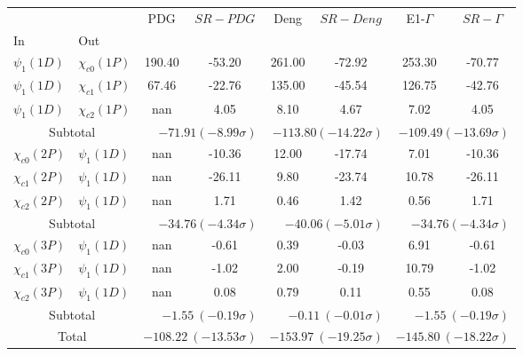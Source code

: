 \begin{tabular}{|l|l|c|c|c|c|c|c|}%
\hline%
&&PDG&$SR-PDG$&Deng&$SR-Deng$&E1-$\Gamma$&$SR-\Gamma$\\%
In&Out&&&&&&\\%
\hline%
$\psi_{1}(1D)$&$\chi_{c0}(1P)$&190.40&-53.20&261.00&-72.92&253.30&-70.77\\%
$\psi_{1}(1D)$&$\chi_{c1}(1P)$&67.46&-22.76&135.00&-45.54&126.75&-42.76\\%
$\psi_{1}(1D)$&$\chi_{c2}(1P)$&nan&4.05&8.10&4.67&7.02&4.05\\%
\hline%
\hline%
\multicolumn{2}{|c|}{Subtotal}&\multicolumn{2}{|r|}{$-71.91 (-8.99\sigma)$}&\multicolumn{2}{|r|}{$-113.80 (-14.22\sigma)$}&\multicolumn{2}{|r|}{$-109.49 (-13.69\sigma)$}\\%
\hline%
\hline%
$\chi_{c0}(2P)$&$\psi_{1}(1D)$&nan&-10.36&12.00&-17.74&7.01&-10.36\\%
$\chi_{c1}(2P)$&$\psi_{1}(1D)$&nan&-26.11&9.80&-23.74&10.78&-26.11\\%
$\chi_{c2}(2P)$&$\psi_{1}(1D)$&nan&1.71&0.46&1.42&0.56&1.71\\%
\hline%
\hline%
\multicolumn{2}{|c|}{Subtotal}&\multicolumn{2}{|r|}{$-34.76 (-4.34\sigma)$}&\multicolumn{2}{|r|}{$-40.06 (-5.01\sigma)$}&\multicolumn{2}{|r|}{$-34.76 (-4.34\sigma)$}\\%
\hline%
\hline%
$\chi_{c0}(3P)$&$\psi_{1}(1D)$&nan&-0.61&0.39&-0.03&6.91&-0.61\\%
$\chi_{c1}(3P)$&$\psi_{1}(1D)$&nan&-1.02&2.00&-0.19&10.79&-1.02\\%
$\chi_{c2}(3P)$&$\psi_{1}(1D)$&nan&0.08&0.79&0.11&0.55&0.08\\%
\hline%
\hline%
\multicolumn{2}{|c|}{Subtotal}&\multicolumn{2}{|r|}{$-1.55~(-0.19\sigma)$}&\multicolumn{2}{|r|}{$-0.11~(-0.01\sigma)$}&\multicolumn{2}{|r|}{$-1.55~(-0.19\sigma)$}\\%
\hline%
\hline%
\multicolumn{2}{|c|}{Total}&\multicolumn{2}{|r|}{$-108.22~(-13.53\sigma)$}&\multicolumn{2}{|r|}{$-153.97~(-19.25\sigma)$}&\multicolumn{2}{|r|}{$-145.80~(-18.22\sigma)$}\\%
\hline%
\end{tabular}